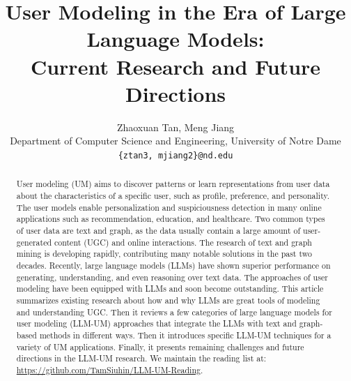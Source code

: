 \documentclass[11pt]{article}
\begin{document}
\title{User Modeling in the Era of Large Language Models: \\Current Research and Future Directions}
\author
{Zhaoxuan Tan, Meng Jiang \\
\small{Department of Computer Science and Engineering, University of Notre Dame}\\ 
\small\texttt{\{ztan3, mjiang2\}@nd.edu}
}
\maketitle

\begin{abstract}
User modeling (UM) aims to discover patterns or learn representations from user data about the characteristics of a specific user, such as profile, preference, and personality. The user models enable personalization and suspiciousness detection in many online applications such as recommendation, education, and healthcare. Two common types of user data are text and graph, as the data usually contain a large amount of user-generated content (UGC) and online interactions. The research of text and graph mining is developing rapidly, contributing many notable solutions in the past two decades. Recently, large language models (LLMs) have shown superior performance on generating, understanding, and even reasoning over text data. The approaches of user modeling have been equipped with LLMs and soon become outstanding. This article summarizes existing research about how and why LLMs are great tools of modeling and understanding UGC. Then it reviews a few categories of large language models for user modeling (LLM-UM) approaches that integrate the LLMs with text and graph-based methods in different ways. Then it introduces specific LLM-UM techniques for a variety of UM applications. Finally, it presents remaining challenges and future directions in the LLM-UM research. We maintain the reading list at: \url{https://github.com/TamSiuhin/LLM-UM-Reading}.


\end{abstract}
\end{document}
